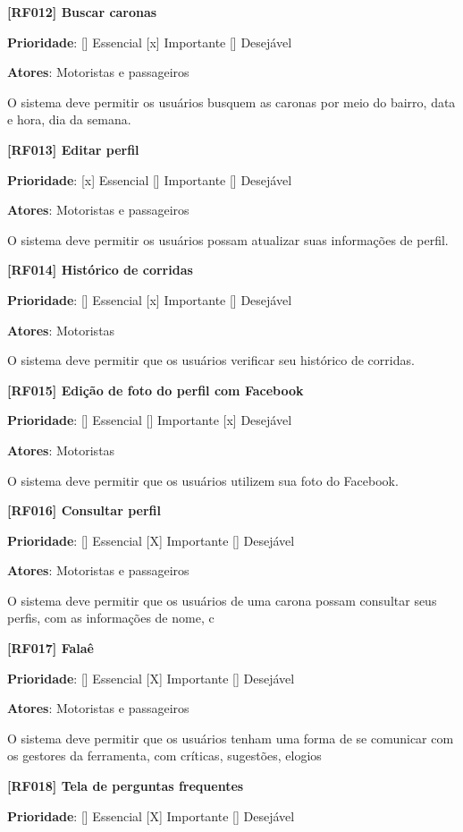 \textbf{[RF012] Buscar caronas}

\textbf{Prioridade}:      [] Essencial        [x] Importante     [] Desejável 

\textbf{Atores}: Motoristas e passageiros

O sistema deve permitir os usuários busquem as caronas por meio do bairro, data e hora, dia da semana.

\textbf{[RF013] Editar perfil}

\textbf{Prioridade}:      [x] Essencial        [] Importante     [] Desejável 

\textbf{Atores}: Motoristas e passageiros

O sistema deve permitir os usuários possam atualizar suas informações de perfil.

\textbf{[RF014] Histórico de corridas}

\textbf{Prioridade}:      [] Essencial        [x] Importante     [] Desejável 

\textbf{Atores}: Motoristas

O sistema deve permitir que os usuários verificar seu histórico de corridas.

\textbf{[RF015] Edição de foto do perfil com Facebook}

\textbf{Prioridade}:      [] Essencial        [] Importante     [x] Desejável 

\textbf{Atores}: Motoristas

O sistema deve permitir que os usuários utilizem sua foto do Facebook.


\textbf{[RF016] Consultar perfil}

\textbf{Prioridade}:      [] Essencial        [X] Importante     [] Desejável 

\textbf{Atores}: Motoristas e passageiros

O sistema deve permitir que os usuários de uma carona possam consultar seus perfis, com as informações de nome, c


\textbf{[RF017] Falaê}

\textbf{Prioridade}:      [] Essencial        [X] Importante     [] Desejável 

\textbf{Atores}: Motoristas e passageiros

O sistema deve permitir que os usuários tenham uma forma de se comunicar com os gestores da ferramenta, com críticas, sugestões, elogios

\textbf{[RF018]  Tela de perguntas frequentes}

\textbf{Prioridade}:      [] Essencial        [X] Importante     [] Desejável 


